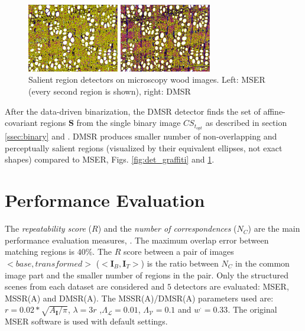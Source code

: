 \documentclass{article}
\def\I{{\mathbf I}}
\def\mcL{{\mathcal{L}}}
\def\mcV{{\mathcal{V}}}
\def\S{{\mathbf S}}
\begin{document}
\begin{figure}[htb]

\begin{minipage}[b]{.49\linewidth}
  \centering
  \centerline{\includegraphics[width=4.0cm]{./Figs/mserWood}}
\end{minipage}
\hfill
\begin{minipage}[b]{0.49\linewidth}
  \centering
  \centerline{\includegraphics[width=4.0cm]{./Figs/dmsrWood}}
\end{minipage}
\vspace{-0.25cm}
\caption{Salient region detectors on microscopy wood images. Left: MSER (every second region is shown), right: DMSR}
\label{fig:wood}
%
\end{figure}
\vspace{-0.5cm}
After the data-driven binarization, the DMSR detector finds the set of affine-covariant regions $\S$ from the single binary image $CS_{t_{opt}}$ as described in section \ref{ssec:binary} and \cite{RangMSSR06, RangHumpb06}. DMSR produces smaller number of non-overlapping and perceptually salient regions (visualized by their equivalent ellipses, not exact shapes) compared to MSER, Figs. \ref{fig:det_graffiti} and \ref{fig:wood}.


\section{Performance  Evaluation}
\label{sec:perf}
The {\em repeatability score} ($R$) and the {\em number of correspondences} ($N_C$) are the main performance evaluation measures, \cite{Mikolajczyk:2005}. The maximum overlap error between matching regions is $40\%$. The $R$ score between a pair of images $<base, transformed>$ ($<\I_B,\I_T>$) is the ratio between $N_C$ in the common image part and the smaller number of regions in the pair. Only the structured scenes from each dataset are considered and $5$ detectors are evaluated: MSER, MSSR(A) and DMSR(A). The MSSR(A)/DMSR(A) parameters used are: $r = 0.02*\sqrt{A_{\I} / \pi}$, $\lambda=3r$ ,$\Lambda_{\mcL}=0.01$, $\Lambda_{\mcV}=0.1$ and  $w^{\cdot}=0.33$. The original MSER software is used with default settings. 
\end{document}
